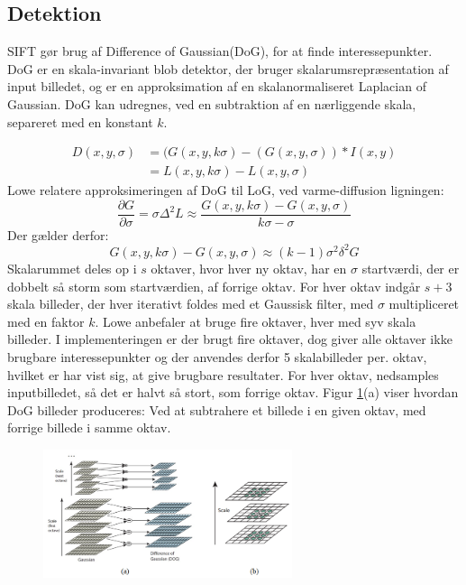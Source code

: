 \subsection{Detektion}
SIFT gør brug af Difference of Gaussian(DoG), for at finde interessepunkter. DoG er en skala-invariant blob detektor, der bruger skalarumsrepræsentation af input billedet, og er en approksimation af en skalanormaliseret Laplacian of Gaussian. DoG kan udregnes, ved en subtraktion af en nærliggende skala, separeret med en konstant $k$. 

\begin{equation}
\begin{split}
D(x,y,\sigma) &= (G(x,y,k\sigma)-(G(x,y,\sigma))\ast I(x,y) \\
           &= L(x,y,k \sigma)-L(x,y,\sigma)
\end{split}
\end{equation}
Lowe relatere approksimeringen af DoG til LoG, ved varme-diffusion ligningen:
\begin{equation}
\dfrac{\partial G}{\partial \sigma} = \sigma \Delta^2L \approx \frac{G(x,y,k\sigma) - G(x,y,\sigma)}{k\sigma-\sigma}
\label{heat}
\end{equation}
Der gælder derfor: 
\begin{equation}
G(x,y,k\sigma) - G(x,y,\sigma) \approx (k - 1)\sigma^2\delta^2G
\end{equation}
Skalarummet deles op i $s$ oktaver, hvor hver ny oktav, har en $\sigma$ startværdi, der er dobbelt så storm som startværdien, af forrige oktav. For hver oktav indgår $s+3$ skala billeder, der hver iterativt foldes med et Gaussisk filter, med $\sigma$ multipliceret med en faktor $k$. Lowe anbefaler at bruge fire oktaver, hver med syv skala billeder. I implementeringen er der brugt fire oktaver, dog giver alle oktaver ikke brugbare interessepunkter og der anvendes derfor 5 skalabilleder per. oktav, hvilket er har vist sig, at give brugbare resultater. For hver oktav, nedsamples inputbilledet, så det er halvt så stort, som forrige oktav. Figur \ref{fig:difference}(a) viser hvordan DoG billeder produceres: Ved at subtrahere et billede i en given oktav, med forrige billede i samme oktav.
\begin{figure}[H]
    \centering
    \includegraphics[width=0.65\textwidth]{fig/30.png}
     \vspace{-1em}
    \begin{center}    
       \caption{\textcolor{gray}{\footnotesize \textit{ }}}
    \label{fig:difference}
     \end{center}
     \vspace{-2.5em}
  \end{figure} \noindent
